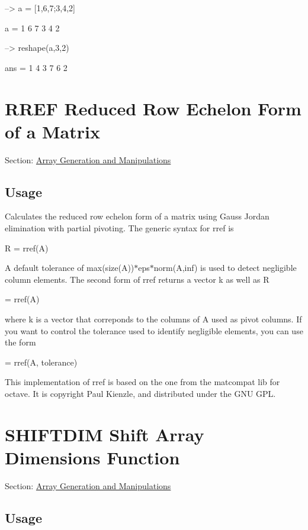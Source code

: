 \begin{DoxyVerbInclude}
--> a = [1,6,7;3,4,2]

a = 
 1 6 7 
 3 4 2 

--> reshape(a,3,2)

ans = 
 1 4 
 3 7 
 6 2 
\end{DoxyVerbInclude}
 \hypertarget{array_rref}{}\section{R\-R\-E\-F Reduced Row Echelon Form of a Matrix}\label{array_rref}
Section\-: \hyperlink{sec_array}{Array Generation and Manipulations} \hypertarget{vtkwidgets_vtkxyplotwidget_Usage}{}\subsection{Usage}\label{vtkwidgets_vtkxyplotwidget_Usage}
Calculates the reduced row echelon form of a matrix using Gauss Jordan elimination with partial pivoting. The generic syntax for {\ttfamily rref} is \begin{DoxyVerb}   R = rref(A)
\end{DoxyVerb}
 A default tolerance of {\ttfamily max(size(\-A))$\ast$eps$\ast$norm(A,inf)} is used to detect negligible column elements. The second form of {\ttfamily rref} returns a vector {\ttfamily k} as well as {\ttfamily R} \begin{DoxyVerb}  [R,k] = rref(A)
\end{DoxyVerb}
 where {\ttfamily k} is a vector that correponds to the columns of {\ttfamily A} used as pivot columns. If you want to control the tolerance used to identify negligible elements, you can use the form \begin{DoxyVerb}  [R,k] = rref(A, tolerance)
\end{DoxyVerb}
 This implementation of {\ttfamily rref} is based on the one from the matcompat lib for octave. It is copyright Paul Kienzle, and distributed under the G\-N\-U G\-P\-L. \hypertarget{array_shiftdim}{}\section{S\-H\-I\-F\-T\-D\-I\-M Shift Array Dimensions Function}\label{array_shiftdim}
Section\-: \hyperlink{sec_array}{Array Generation and Manipulations} \hypertarget{vtkwidgets_vtkxyplotwidget_Usage}{}\subsection{Usage}\label{vtkwidgets_vtkxyplotwidget_Usage}
